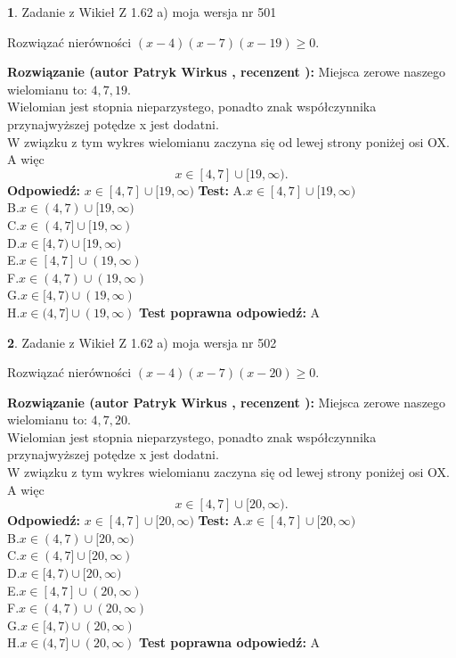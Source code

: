 \documentclass[12pt, a4paper]{article}
\theoremstyle{definition} %
\newtheorem{zad}{}
\newcommand{\zadStart}[1]{\begin{zad}#1\newline}
\newcommand{\zadStop}{\end{zad}}
\newcommand{\rozwStart}[2]{\noindent \textbf{Rozwiązanie (autor #1 , recenzent #2): }\newline}
\newcommand{\rozwStop}{\newline}
\newcommand{\odpStart}{\noindent \textbf{Odpowiedź:}\newline}
\newcommand{\odpStop}{\newline}
\newcommand{\testStart}{\noindent \textbf{Test:}\newline}
\newcommand{\testStop}{\newline}
\newcommand{\kluczStart}{\noindent \textbf{Test poprawna odpowiedź:}\newline}
\newcommand{\kluczStop}{\newline}
\begin{document}
\zadStart{Zadanie z Wikieł Z 1.62 a) moja wersja nr 501}

Rozwiązać nierówności $(x-4)(x-7)(x-19)\ge0$.
\zadStop
\rozwStart{Patryk Wirkus}{}
Miejsca zerowe naszego wielomianu to: $4, 7, 19$.\\
Wielomian jest stopnia nieparzystego, ponadto znak współczynnika przy\linebreak najwyższej potędze x jest dodatni.\\ W związku z tym wykres wielomianu zaczyna się od lewej strony poniżej osi OX. A więc $$x \in [4,7] \cup [19,\infty).$$
\rozwStop
\odpStart
$x \in [4,7] \cup [19,\infty)$
\odpStop
\testStart
A.$x \in [4,7] \cup [19,\infty)$\\
B.$x \in (4,7) \cup [19,\infty)$\\
C.$x \in (4,7] \cup [19,\infty)$\\
D.$x \in [4,7) \cup [19,\infty)$\\
E.$x \in [4,7] \cup (19,\infty)$\\
F.$x \in (4,7) \cup (19,\infty)$\\
G.$x \in [4,7) \cup (19,\infty)$\\
H.$x \in (4,7] \cup (19,\infty)$
\testStop
\kluczStart
A
\kluczStop



\zadStart{Zadanie z Wikieł Z 1.62 a) moja wersja nr 502}

Rozwiązać nierówności $(x-4)(x-7)(x-20)\ge0$.
\zadStop
\rozwStart{Patryk Wirkus}{}
Miejsca zerowe naszego wielomianu to: $4, 7, 20$.\\
Wielomian jest stopnia nieparzystego, ponadto znak współczynnika przy\linebreak najwyższej potędze x jest dodatni.\\ W związku z tym wykres wielomianu zaczyna się od lewej strony poniżej osi OX. A więc $$x \in [4,7] \cup [20,\infty).$$
\rozwStop
\odpStart
$x \in [4,7] \cup [20,\infty)$
\odpStop
\testStart
A.$x \in [4,7] \cup [20,\infty)$\\
B.$x \in (4,7) \cup [20,\infty)$\\
C.$x \in (4,7] \cup [20,\infty)$\\
D.$x \in [4,7) \cup [20,\infty)$\\
E.$x \in [4,7] \cup (20,\infty)$\\
F.$x \in (4,7) \cup (20,\infty)$\\
G.$x \in [4,7) \cup (20,\infty)$\\
H.$x \in (4,7] \cup (20,\infty)$
\testStop
\kluczStart
A
\kluczStop
\end{document}
